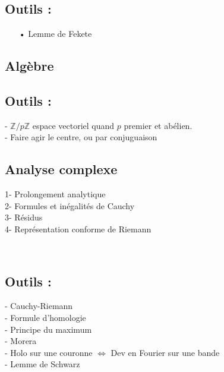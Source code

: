 \documentclass[11pt,a4paper]{article}
\begin{document}
\subsection*{Outils :}
\begin{itemize}
\item[•] Lemme de Fekete
\end{itemize}



\newpage
\begin{center}
\section*{Algèbre} 
\end{center}

\subsection*{Outils :}
- $\mathbb{Z}/p\mathbb{Z}$ espace vectoriel quand $p$ premier et abélien. \\
- Faire agir le centre, ou par conjuguaison




\newpage
\begin{center}
\section*{Analyse complexe} 
\end{center}

1- Prolongement analytique \\

2- Formules et inégalités de Cauchy \\

3- Résidus \\

4- Représentation conforme de Riemann

~\\

\subsection*{Outils :}
- Cauchy-Riemann \\

- Formule d'homologie \\

- Principe du maximum \\

- Morera \\

- Holo sur une couronne $\Leftrightarrow$ Dev en Fourier sur une bande \\

- Lemme de Schwarz \\
\end{document}
